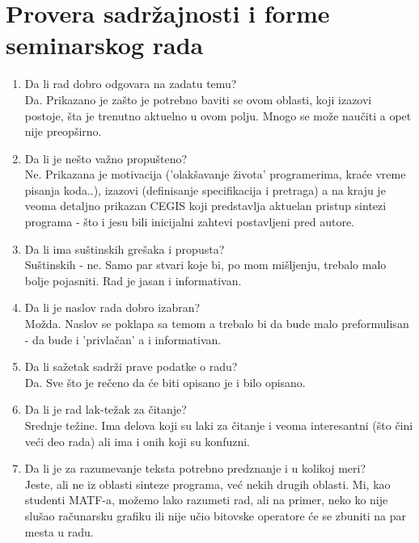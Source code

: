 \documentclass[a4paper]{report}
\begin{document}
\section{Provera sadržajnosti i forme seminarskog rada}

\begin{enumerate}
\item Da li rad dobro odgovara na zadatu temu?\\ 
Da. Prikazano je zašto je potrebno baviti se ovom oblasti, koji izazovi postoje, šta je trenutno aktuelno u ovom polju. Mnogo se može naučiti a opet nije preopširno.

\item Da li je nešto važno propušteno?\\ 
Ne. Prikazana je motivacija ('olakšavanje života' programerima, kraće vreme pisanja koda..), izazovi (definisanje specifikacija i pretraga) a na kraju je veoma detaljno prikazan CEGIS koji predstavlja aktuelan pristup sintezi programa - što i jesu bili inicijalni zahtevi postavljeni pred autore. 

\item Da li ima suštinskih grešaka i propusta?\\ 
Suštinskih - ne. Samo par stvari koje bi, po mom mišljenju, trebalo malo bolje pojasniti. Rad je jasan i informativan.

\item Da li je naslov rada dobro izabran?\\ 
Možda. Naslov se poklapa sa temom a trebalo bi da bude malo preformulisan - da bude i 'privlačan' a i informativan. 

\item Da li sažetak sadrži prave podatke o radu?\\ 
Da. Sve što je rečeno da će biti opisano je i bilo opisano.

\item Da li je rad lak-težak za čitanje?\\ 
Srednje težine. Ima delova koji su laki za čitanje i veoma interesantni (što čini veći deo rada) ali ima i onih koji su konfuzni.

\item Da li je za razumevanje teksta potrebno predznanje i u kolikoj meri?\\ 
Jeste, ali ne iz oblasti sinteze programa, već nekih drugih oblasti. Mi, kao studenti MATF-a, možemo lako razumeti rad, ali na primer, neko ko nije slušao računarsku grafiku ili nije učio bitovske operatore će se zbuniti na par mesta u radu.


\end{enumerate}
\end{document}
